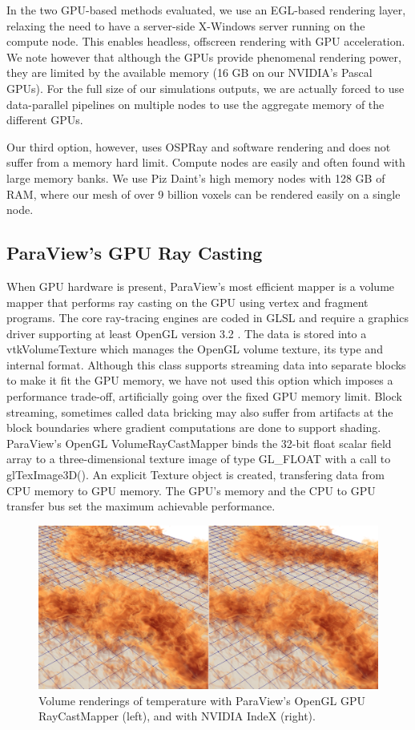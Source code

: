 \documentclass[5p,times]{elsarticle}
\begin{document}
In the two GPU-based methods evaluated, we use an EGL-based rendering layer,
relaxing the need to have a server-side X-Windows server running on the compute node.
This enables headless, offscreen rendering with GPU acceleration. We note however that although
the GPUs provide phenomenal rendering power, they are limited by the available memory
(16 GB on our NVIDIA's Pascal GPUs). For the full size of our simulations outputs,
we are actually forced to use data-parallel pipelines on multiple nodes to use
the aggregate memory of the different GPUs.

Our third option, however, uses OSPRay and software rendering and does not suffer
from a memory hard limit. Compute nodes are easily and often found with large memory
banks. We use Piz Daint's high memory nodes with 128 GB of RAM, where our mesh of
over 9 billion voxels can be rendered easily on a single node.


\subsection{ParaView's GPU Ray Casting} \label{smart}

When GPU hardware is present, ParaView's most efficient mapper is a volume
mapper that performs ray casting on the GPU using vertex and fragment programs.
The core ray-tracing engines are coded in GLSL and require a graphics driver supporting at least
OpenGL version 3.2 \cite{ShadersInVTK}. The data is stored into a vtkVolumeTexture which manages
the OpenGL volume texture, its type and internal format.
Although this class supports streaming data into
separate blocks to make it fit the GPU memory, we have not used this option which imposes
a performance trade-off, artificially going over the fixed GPU memory limit.
Block streaming, sometimes called data bricking may also suffer from artifacts at
the block boundaries where gradient computations are done to support shading.
ParaView's OpenGL VolumeRayCastMapper binds the 32-bit float scalar field array
 to a three-dimensional texture image of type GL\_FLOAT with a call to glTexImage3D().
An explicit Texture object is created, transfering data from CPU memory to GPU memory.
The GPU's memory and the CPU to GPU transfer bus set the maximum achievable performance.

\begin{figure}
	\centering
	\includegraphics[width=\linewidth]{fig2}%
	\caption{\label{fig:gpucloseup} Volume renderings of temperature with ParaView's
OpenGL GPU RayCastMapper (left), and with NVIDIA IndeX (right).}
\end{figure}
\end{document}
